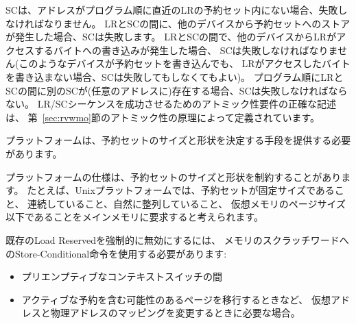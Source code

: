 SCは、アドレスがプログラム順に直近のLRの予約セット内にない場合、失敗しなければなりません。
LRとSCの間に、他のデバイスから予約セットへのストアが発生した場合、SCは失敗します。
LRとSCの間で、他のデバイスからLRがアクセスするバイトへの書き込みが発生した場合、
SCは失敗しなければなりません(このようなデバイスが予約セットを書き込んでも、
LRがアクセスしたバイトを書き込まない場合、SCは失敗してもしなくてもよい)。
プログラム順にLRとSCの間に別のSCが(任意のアドレスに)存在する場合、SCは失敗しなければならない。
LR/SCシーケンスを成功させるためのアトミック性要件の正確な記述は、
第~\ref{sec:rvwmo}節のアトミック性の原理によって定義されています。

\begin{commentary}
\begin{comment}
The platform should provide a means to determine the size and shape of the
reservation set.
\end{comment}
プラットフォームは、予約セットのサイズと形状を決定する手段を提供する必要があります。

\begin{comment}
A platform specification may constrain the size and shape of the reservation
set.
For example, the Unix platform is expected to require of main memory that the
reservation set be of fixed size, contiguous, naturally aligned, and no
greater than the virtual memory page size.
\end{comment}
プラットフォームの仕様は、予約セットのサイズと形状を制約することがあります。
たとえば、Unixプラットフォームでは、予約セットが固定サイズであること、
連続していること、自然に整列していること、
仮想メモリのページサイズ以下であることをメインメモリに要求すると考えられます。
\end{commentary}

\begin{commentary}
\begin{comment}
A store-conditional instruction to a scratch word of memory should be used
to forcibly invalidate any existing load reservation:
\begin{itemize}
\item during a preemptive context switch, and
\item if necessary when changing virtual to physical address mappings,
  such as when migrating pages that might contain an active reservation.
\end{itemize}
\end{comment}

既存のLoad Reservedを強制的に無効にするには、
メモリのスクラッチワードへのStore-Conditional命令を使用する必要があります:
\begin{itemize}
\item プリエンプティブなコンテキストスイッチの間
\item アクティブな予約を含む可能性のあるページを移行するときなど、
仮想アドレスと物理アドレスのマッピングを変更するときに必要な場合。
\end{itemize}
\end{commentary}

